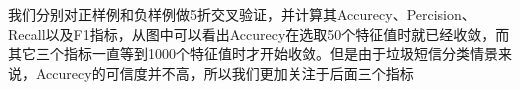 \documentclass[a4paper,11pt,twoside,openany]{article}
\begin{document}
\begin{CJK*}{UTF8}{gbsn}

我们分别对正样例和负样例做5折交叉验证，并计算其Accurecy、Percision、Recall以及F1指标，从图中可以看出Accurecy在选取50个特征值时就已经收敛，而其它三个指标一直等到1000个特征值时才开始收敛。但是由于垃圾短信分类情景来说，Accurecy的可信度并不高，所以我们更加关注于后面三个指标



\end{CJK*}
\end{document}

